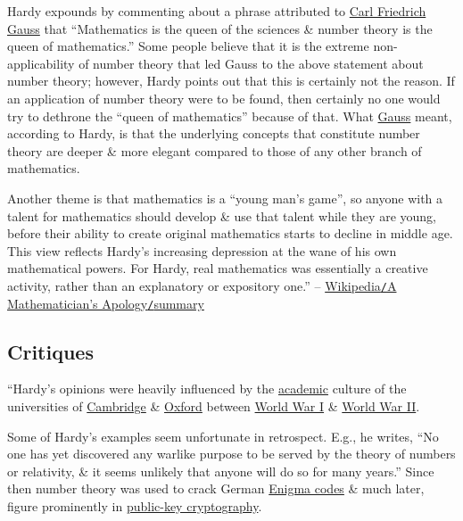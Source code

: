 \documentclass[oneside]{book}
\numberwithin{equation}{section}
\begin{document}
Hardy expounds by commenting about a phrase attributed to \href{https://en.wikipedia.org/wiki/Carl_Friedrich_Gauss}{Carl Friedrich Gauss} that ``Mathematics is the queen of the sciences \& number theory is the queen of mathematics.'' Some people believe that it is the extreme non-applicability of number theory that led Gauss to the above statement about number theory; however, Hardy points out that this is certainly not the reason. If an application of number theory were to be found, then certainly no one would try to dethrone the ``queen of mathematics'' because of that. What \href{https://en.wikipedia.org/wiki/Carl_Friedrich_Gauss}{Gauss} meant, according to Hardy, is that the underlying concepts that constitute number theory are deeper \& more elegant compared to those of any other branch of mathematics.

Another theme is that mathematics is a ``young man's game'', so anyone with a talent for mathematics should develop \& use that talent while they are young, before their ability to create original mathematics starts to decline in middle age. This view reflects Hardy's increasing depression at the wane of his own mathematical powers. For Hardy, real mathematics was essentially a creative activity, rather than an explanatory or expository one.'' -- \href{https://en.wikipedia.org/wiki/A_Mathematician%27s_Apology#Summary}{Wikipedia\texttt{/}A Mathematician's Apology\texttt{/}summary}

\subsection{Critiques}
``Hardy's opinions were heavily influenced by the \href{https://en.wikipedia.org/wiki/Academia}{academic} culture of the universities of \href{https://en.wikipedia.org/wiki/Cambridge}{Cambridge} \& \href{https://en.wikipedia.org/wiki/Oxford}{Oxford} between \href{https://en.wikipedia.org/wiki/World_War_I}{World War I} \& \href{https://en.wikipedia.org/wiki/World_War_II}{World War II}.

Some of Hardy's examples seem unfortunate in retrospect. E.g., he writes, ``No one has yet discovered any warlike purpose to be served by the theory of numbers or relativity, \& it seems unlikely that anyone will do so for many years.'' Since then number theory was used to crack German \href{https://en.wikipedia.org/wiki/Enigma_machine}{Enigma codes} \& much later, figure prominently in \href{https://en.wikipedia.org/wiki/Public-key_cryptography}{public-key cryptography}.
\end{document}
